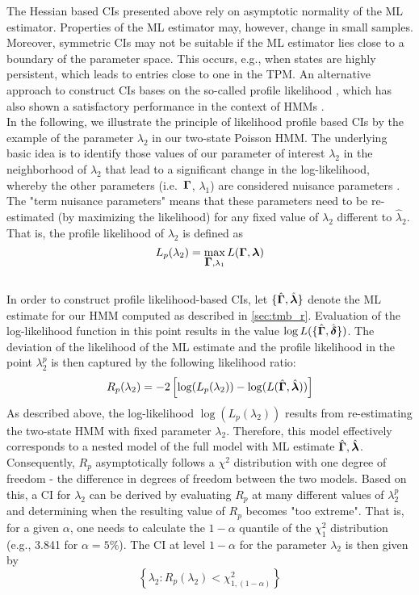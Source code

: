 \documentclass[bimj,fleqn]{w-art}\usepackage[]{graphicx}\usepackage[]{color}
\newcommand{\bgamma}{\mbox{\boldmath $\Gamma$}}
\newcommand{\bfdelta}{\mbox{\boldmath $\delta$}}
\newcommand{\bflambda}{\mbox{\boldmath $\lambda$}}
\theoremstyle{plain}
\theoremstyle{definition}
\begin{document}
The Hessian based CIs presented above rely on asymptotic normality of the ML estimator. Properties of the ML estimator may, however, change in small samples. Moreover, symmetric CIs may not be suitable if the ML estimator lies close to a boundary of the parameter space. This occurs, e.g., when states are highly persistent, which leads to entries close to one in the TPM. An alternative approach to construct CIs bases on the so-called profile likelihood \citep[see, e.g.,][]{venzon, meeker}, which has also shown a satisfactory performance in the context of HMMs \citep{visser}.\\
In the following, we illustrate the principle of likelihood profile based CIs by the example of the parameter $\lambda_2$ in our two-state Poisson HMM. The underlying basic idea is to identify those values of our parameter of interest $\lambda_2$ in the neighborhood of $\hat \lambda_2$ that lead to a significant change in the log-likelihood, whereby the other parameters (i.e.~$\bgamma$, $\lambda_1$) are considered nuisance parameters \citep{meeker}. The "term nuisance parameters" means that these parameters need to be re-estimated (by maximizing the likelihood) for any fixed value of $\lambda_2$ different to $\hat \lambda_2$. That is, the profile likelihood of $\lambda_2$ is defined as
\begin{equation*}
L_p(\lambda_2) = \max_{\bgamma, \lambda_1} L(\bgamma, \bflambda)
\end{equation*}
\\
In order to construct profile likelihood-based CIs, let $\{\hat{\bgamma}, \hat{\bflambda}\}$ denote the ML estimate for our HMM computed as described in \autoref{sec:tmb_r}. Evaluation of the log-likelihood function in this point results in the value $\log L(\{\hat{\bgamma}, \hat{\bfdelta}\})$. The deviation of the likelihood of the ML estimate and the profile likelihood in the point $\lambda_2^p$ is then captured by the following likelihood ratio:
\begin{equation}
R_p(\lambda_2) = -2 \left[ \log(L_p(\lambda_2)) - \log(L(\hat{\bgamma}, \hat{\bflambda}))\right]
\label{eq:profileLR}
\end{equation}
As described above, the log-likelihood $\log(L_p(\lambda_2))$ results from re-estimating the two-state HMM with fixed parameter $\lambda_2$. Therefore, this model effectively corresponds to a nested model of the full model with ML estimate $\hat{\bgamma}, \hat{\bflambda}$. Consequently, $R_p$ asymptotically follows a $\chi^{2}$ distribution with one degree of freedom - the difference in degrees of freedom between the two models. Based on this, a CI for $\lambda_2$ can be derived by evaluating $R_p$ at many different values of $\lambda_2^p$ and determining when the resulting value of $R_p$ becomes "too extreme". That is, for a given $\alpha$, one needs to calculate the $1-\alpha$ quantile of the $\chi^{2}_{1}$ distribution (e.g., 3.841 for $\alpha = 5\%$). The CI at level $1-\alpha$ for the parameter $\lambda_2$ is then given by 
\begin{equation}
\left\{\lambda_2: R_p(\lambda_2)  < \chi^{2}_{1, (1-\alpha)}\right\}
\label{eq:profileCI}
\end{equation}
\end{document}
